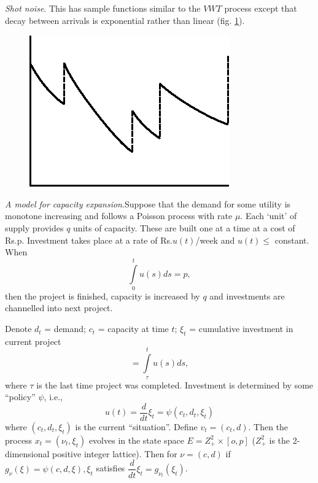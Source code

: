 \begin{example}\label{chap1:sec2.6} %
  \textit{Shot noise}. This has sample functions similar to the $VWT$
  process except that decay between arrivals is exponential rather
  than linear (fig. \ref{chap1:fig2.1}). 

\setcounter{figure}{0}
\begin{figure}[H]
\centering
\includegraphics{vol75-figures/fig2.1.eps}
\caption{}\label{chap1:fig2.1}
\end{figure}
\end{example}

\begin{example}%
  \textit{A model for capacity expansion}.\pageoriginale Suppose that
  the demand for 
  some utility is monotone increasing and follows a Poisson process
  with rate $\mu$. Each `unit' of supply provides $q$ units of
  capacity. These are built one at a time at a cost of
  Rs.p. Investment takes place at a rate of Rs.$u(t)$/week and
  $u(t)\leq $ constant. When  
  $$
  \int\limits^t_0 u(s) ds = p, 
  $$
  then the project is finished, capacity is increased by $q$ and
  investments are channelled into next project.  
\end{example}

  Denote $d_t$ = demand; $c_t$ = capacity at time $t$;
  $\xi_t$ = cumulative investment in current project
$$
=\int\limits^t_\tau u(s) ds,
$$
where $\tau$ is the last time project was completed. Investment is
determined by some ``policy'' $\psi $, i.e.,  
	$$
	u(t) = \frac{d}{dt} \xi_t = \psi (c_t, d_t, \xi_t)
	$$
where $(c_t, d_t, \xi_t)$ is the current ``situation''. Define $v_t =
(c_t, d)$. Then the process $x_t = (\nu_t, \xi_t)$ evolves in the
state space $E = Z^2_+ \times [o, p]$ ($Z^2_+$ is the 2-dimensional
positive integer lattice). Then for $\nu = (c,d )$ if $g_\nu (\xi) =
\psi (c, d, \xi), \xi_t$ satisfies $\dfrac{d}{dt}\xi_t = g_{\nu_t}
(\xi_t)$.  

